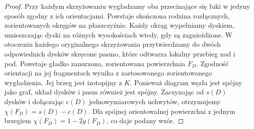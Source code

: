 \begin{proof}
Przy każdym skrzyżowaniu wygładzamy oba przecinające się łuki
w jedyny sposób zgodny z ich orientacjami. Powstaje skończona
rodzina rozłącznych, zorientowanych okręgów na płaszczyźnie.
Każdy okrąg wypełniamy dyskiem, umieszczając dyski na różnych
wysokościach wtedy, gdy są zagnieżdżone. W otoczeniu każdego
oryginalnego skrzyżowania przytwierdzamy do dwóch odpowiednich
dysków skręcone pasmo, które odtwarza lokalny przebieg nad i pod.
Powstaje gładko zanurzona, zorientowana powierzchnia $F_D$.
Zgodność orientacji na jej fragmentach wynika z zastosowanego
zorientowanego wygładzenia. Jej brzeg jest izotopijny z $K$.
Ponieważ diagram węzła jest spójny jako graf, układ dysków
i pasm również jest spójny. Zaczynając od $s(D)$ dysków
i dołączając $c(D)$ jednowymiarowych uchwytów, otrzymujemy
$\chi(F_D)=s(D)-c(D)$. Dla spójnej orientowalnej powierzchni
z jednym brzegiem $\chi(F_D)=1-2g(F_D)$, co daje podany wzór.
\end{proof}

\begin{center}
\end{center}


